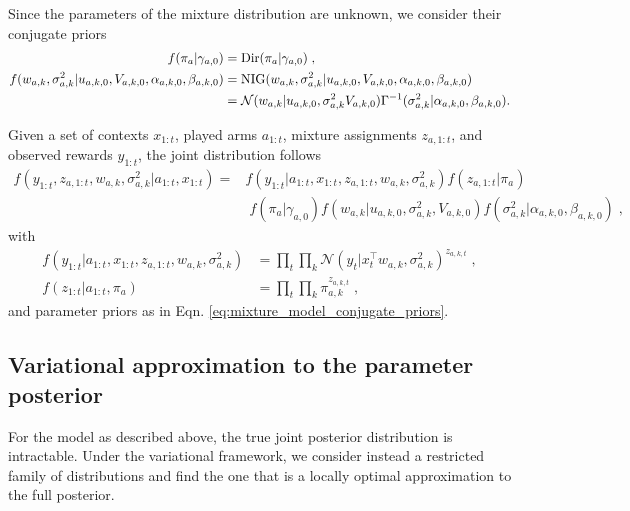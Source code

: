 \documentclass{article}
\newcommand{\N}{\mathcal{N}}
\newcommand{\Dir}{{\rm Dir}}
\newcommand{\NIG}{{\rm NIG}}
\begin{document}
Since the parameters of the mixture distribution are unknown, we consider their conjugate priors
\begin{equation}
\begin{split}
f(\pi_{a}|\gamma_{a,0}) &=\Dir(\pi_a|\gamma_{a,0}) \; ,\\
f(w_{a,k}, \sigma_{a,k}^2|u_{a,k,0}, V_{a,k,0},\alpha_{a,k,0}, \beta_{a,k,0}) &= \NIG(w_{a,k}, \sigma_{a,k}^2 |u_{a,k,0}, V_{a,k,0},\alpha_{a,k,0}, \beta_{a,k,0}) \\
&= \N(w_{a,k}|u_{a,k,0}, \sigma_{a,k}^2V_{a,k,0}) \Gamma^{-1}(\sigma_{a,k}^2|\alpha_{a,k,0}, \beta_{a,k,0}). \\
\end{split}
\label{eq:mixture_model_conjugate_priors}
\end{equation}

Given a set of contexts $x_{1:t}$, played arms $a_{1:t}$, mixture assignments $z_{a,1:t}$, and observed rewards $y_{1:t}$, the joint distribution follows
\begin{equation}
\begin{split}
f(y_{1:t}, z_{a,1:t}, w_{a,k}, \sigma_{a,k}^2|a_{1:t}, x_{1:t}) = & f(y_{1:t}|a_{1:t}, x_{1:t}, z_{a,1:t}, w_{a,k}, \sigma_{a,k}^2) f(z_{a,1:t}|\pi_{a}) \\
& \; f(\pi_{a}|\gamma_{a,0}) f(w_{a,k} |u_{a,k,0},\sigma_{a,k}^2, V_{a,k,0}) f(\sigma_{a,k}^2|\alpha_{a,k,0}, \beta_{a,k,0})\;,
\end{split}
\end{equation}
with 
\begin{equation}
\begin{split}
f(y_{1:t}|a_{1:t}, x_{1:t}, z_{a,1:t}, w_{a,k}, \sigma_{a,k}^2) &= \prod_{t} \prod_k \N(y_t|x_t^\top w_{a,k}, \sigma_{a,k}^2)^{z_{a,k,t}} \;,\\
f(z_{1:t}|a_{1:t},\pi_a) &= \prod_t \prod_k \pi_{a,k}^{z_{a,k,t}} \;,
\end{split}
\end{equation}
and parameter priors as in Eqn. \ref{eq:mixture_model_conjugate_priors}.

\subsection{Variational approximation to the parameter posterior}
\label{ssec:variational_distribution}

For the model as described above, the true joint posterior distribution is intractable. Under the variational framework, we consider instead a restricted family of distributions and find the one that is a locally optimal approximation to the full posterior.
\end{document}
